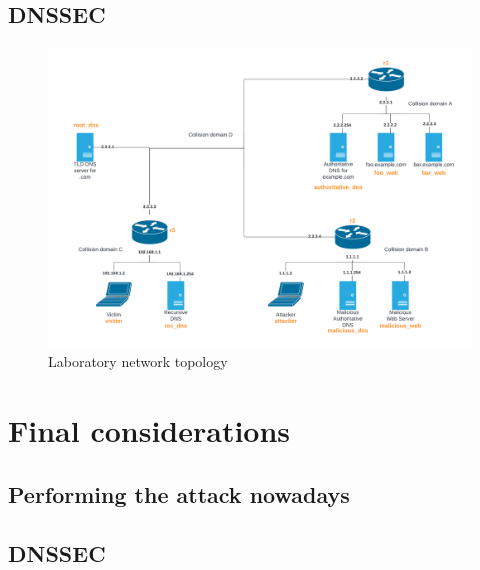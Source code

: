 \documentclass[11pt,a4paper]{article}
\begin{document}
\subsection{DNSSEC}
\begin{figure}[h]
  \centering
  \includegraphics[scale=0.56]{network-topology.png}
  \caption{Laboratory network topology}
\end{figure}

\section{Final considerations}

\subsection{Performing the attack nowadays}

\subsection{DNSSEC}
\end{document}
